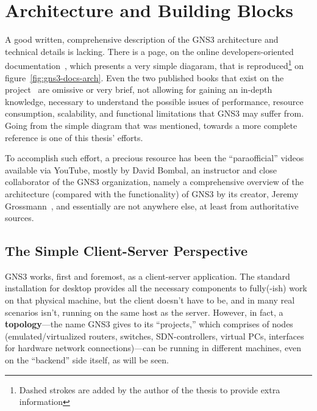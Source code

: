\section{Architecture and Building Blocks}
\label{sec:gns3architecture}

A good written, comprehensive description of the GNS3 architecture and technical details is lacking.
There is a page, on the online developers-oriented documentation~\cite{gns3devarch}, which presents a very simple diagaram, that is reproduced\footnote{Dashed strokes are added by the author of the thesis to provide extra information} on figure~\ref{fig:gns3-docs-arch}.
Even the two published books that exist on the project~\cite{gns3netsimguide,thebookofgns3} are omissive or very brief, not allowing for gaining an in-depth knowledge, necessary to understand the possible issues of performance, resource consumption, scalability, and functional limitations that GNS3 may suffer from.
Going from the simple diagram that was mentioned, towards a more complete reference is one of this thesis' efforts.

To accomplish such effort, a precious resource has been the ``paraofficial'' videos available via YouTube, mostly by David Bombal, an instructor and close collaborator of the GNS3 organization, namely a comprehensive overview of the architecture (compared with the functionality) of GNS3 by its creator, Jeremy Grossmann~\cite{ytgns3arch22}, and essentially are not anywhere else, at least from authoritative sources. %



\subsection{The Simple Client-Server Perspective}
\label{subsec:gns3clientserver}

GNS3 works, first and foremost, as a client-server application.
The standard installation for desktop provides all the necessary components to fully(-ish) work on that physical machine, but the client doesn't have to be, and in many real scenarios isn't, running on the same host as the server.
However, in fact, a \textbf{topology}---the name GNS3 gives to its ``projects,'' which comprises of nodes (emulated/virtualized routers, switches, SDN-controllers, virtual PCs, interfaces for hardware network connections)---can be running in different machines, even on the ``backend'' side itself, as will be seen.


